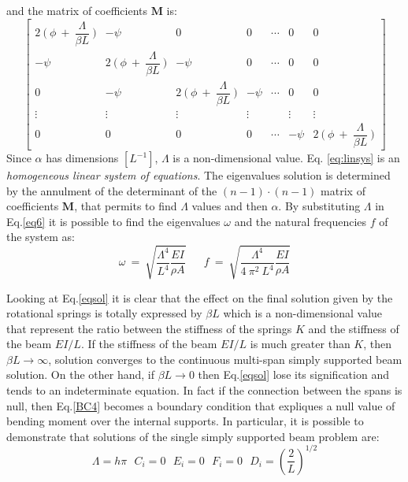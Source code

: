 \documentclass{article}
\begin{document}
{\begin{equation}
\end{equation}
and the matrix of coefficients $\textbf{M}$ is:
\begin{equation}
    \begin{bmatrix}
      2 \ \bigg( \ \phi \ + \ \dfrac{\Lambda}{\beta L} \ \bigg) & -\psi &  0  & 0 & \cdots &  0  & 0 \\
       -\psi  &   2 \ \bigg( \ \phi \ + \ \dfrac{\Lambda}{\beta L} \ \bigg)  &  -\psi  &   0  &  \cdots  & 0  & 0\\
        0   &   -\psi  &   2 \ \bigg( \ \phi \ +\ \dfrac{\Lambda}{\beta L} \ \bigg)  &  -\psi  & \cdots &  0 &  0\\
       \vdots  & \vdots  & \vdots  & \vdots  &  & \vdots & \vdots\\
        0  & 0  & 0  & 0  & \cdots &  -\psi  & 2 \ \bigg( \ \phi \ +\ \dfrac{\Lambda}{\beta L} \ \bigg)
    \end{bmatrix}
\end{equation}
\noindent Since $\alpha$ has dimensions $[L^{-1}]$, $\Lambda$ is a non-dimensional value. Eq. \ref{eq:linsys} is an \textit{homogeneous linear system of equations}. 
The eigenvalues solution is determined by the annulment of the determinant of the $(n-1)\cdot(n-1)$ matrix of coefficients $\textbf{M}$, that permits to find $\Lambda$ values and then $\alpha$. By substituting $\Lambda$ in Eq.\ref{eq6} it is possible to find the eigenvalues $\omega$ and the natural frequencies $f$ of the system as:
\begin{equation}
    \omega \ = \  \sqrt{\dfrac{\Lambda^4}{L^4}\dfrac{E I}{\rho A}} \ \; \; \; \; \;
          f\ = \ \sqrt{\dfrac{\Lambda^4}{4 \ \pi^2 \ L^4}\dfrac{E I}{\rho A}}
    \label{eq:eigen}
\end{equation}

\noindent Looking at Eq.\ref{eqsol} it is clear that the effect on the final solution given by the rotational springs is totally expressed by  $\beta L$ which is a non-dimensional value that represent the ratio between the stiffness of the springs $K$ and the stiffness of the beam $EI/L$.\newline 
If the stiffness of the beam $EI/L$ is much greater than $K$, then $\beta L \xrightarrow{}\infty$, solution converges to the continuous multi-span simply supported beam solution. On the other hand, if $\beta L \xrightarrow{}0$ then Eq.\ref{eqsol} lose its signification and tends to an indeterminate equation. In fact if the connection between the spans is null, then Eq.\ref{BC4} becomes a boundary condition that expliques a null value of bending moment over the internal supports. In particular, it is possible to demonstrate that solutions of the single simply supported beam problem are:
\begin{equation}
    \Lambda = h \pi  \ \ \ C_i=0   \ \ \  E_i=0   \ \ \ F_i=0   \ \ \ D_i = \left(\dfrac{2}{L}\right)^{1/2}
\end{equation}

}
\end{document}
